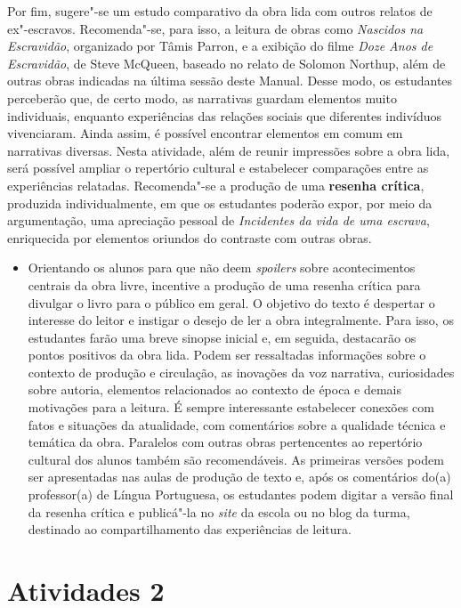 \documentclass[12pt]{extarticle}
\begin{document}
Por fim, sugere"-se um estudo comparativo da obra lida com
outros relatos de ex"-escravos. Recomenda"-se, para isso, a leitura de
obras como \emph{Nascidos na Escravidão}, organizado por Tâmis Parron, e
a exibição do filme \emph{Doze Anos de Escravidão}, de Steve McQueen,
baseado no relato de Solomon Northup, além de outras obras indicadas na
última sessão deste Manual. Desse modo, os estudantes perceberão que, de
certo modo, as narrativas guardam elementos muito individuais, enquanto
experiências das relações sociais que diferentes indivíduos vivenciaram.
Ainda assim, é possível encontrar elementos em comum em narrativas
diversas. Nesta atividade, além de reunir impressões sobre a obra lida,
será possível ampliar o repertório cultural e estabelecer comparações
entre as experiências relatadas. Recomenda"-se a produção de uma
\textbf{resenha crítica}, produzida individualmente, em que os
estudantes poderão expor, por meio da argumentação, uma apreciação
pessoal de \emph{Incidentes da vida de uma escrava}, enriquecida por
elementos oriundos do contraste com outras obras.

\begin{itemize}
\item
  Orientando os alunos para que não deem \emph{spoilers} sobre
  acontecimentos centrais da obra livre, incentive a produção de uma
  resenha crítica para divulgar o livro para o público em geral. O
  objetivo do texto é despertar o interesse do leitor e instigar o
  desejo de ler a obra integralmente. Para isso, os estudantes farão uma
  breve sinopse inicial e, em seguida, destacarão os pontos positivos da
  obra lida. Podem ser ressaltadas informações sobre o contexto de
  produção e circulação, as inovações da voz narrativa, curiosidades
  sobre autoria, elementos relacionados ao contexto de época e demais
  motivações para a leitura. É sempre interessante estabelecer conexões
  com fatos e situações da atualidade, com comentários sobre a qualidade
  técnica e temática da obra. Paralelos com outras obras pertencentes ao
  repertório cultural dos alunos também são recomendáveis. As primeiras
  versões podem ser apresentadas nas aulas de produção de texto e, após
  os comentários do(a) professor(a) de Língua Portuguesa, os estudantes
  podem digitar a versão final da resenha crítica e publicá"-la no
  \emph{site} da escola ou no blog da turma, destinado ao
  compartilhamento das experiências de leitura.
\end{itemize}


\section{Atividades 2}
\end{document}
